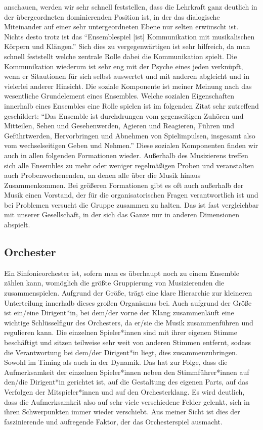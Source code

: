 anschauen, werden wir sehr schnell feststellen, dass die Lehrkraft ganz deutlich
in der übergeordneten dominierenden Position ist, in der das dialogische
Miteinander auf einer sehr untergeordneten Ebene nur selten erwünscht ist.
Nichts desto trotz ist das \enquote{Ensemblespiel [ist] Kommunikation mit
musikalischen Körpern und Klängen.} \autocite[62]{doerne:umfassend_musizieren}
Sich dies zu vergegenwärtigen ist sehr hilfreich, da man schnell feststellt
welche zentrale Rolle dabei die Kommunikation spielt. Die Kommunikation wiederum
ist sehr eng mit der Psyche eines jeden verknüpft, wenn er Sitautionen für sich
selbst auswertet und mit anderen abgleicht und in vielerlei anderer Hinsicht.
Die soziale Komponente ist meiner Meinung nach das wesentliche Grundelement
eines Ensembles. Welche sozialen Eigenschaften innerhalb eines Ensembles eine
Rolle spielen ist im folgenden Zitat sehr zutreffend geschildert: \enquote{Das
Ensemble ist durchdrungen vom gegenseitigen Zuhören und Mitteilen, Sehen und
Gesehenwerden, Agieren und Reagieren, Führen und Geführtwerden, Hervorbringen
und Abnehmen von Spielimpulsen, insgesamt also vom wechselseitigen Geben und
Nehmen.} \autocite[62]{doerne:umfassend_musizieren} Diese sozialen Komponenten
finden wir auch in allen folgenden Formationen wieder. Außerhalb des Musizierens
treffen sich alle Ensembles zu mehr oder weniger regelmäßigen Proben und
veranstalten auch Probenwochenenden, an denen alle über die Musik hinaus
Zusammenkommen. Bei größeren Formationen gibt es oft auch außerhalb der Musik
einen Vorstand, der für die organisatorischen Fragen verantwortlich ist und bei
Problemen versucht die Gruppe zusammen zu halten. Das ist fast vergleichbar mit
unserer Gesellschaft, in der sich das Ganze nur in anderen Dimensionen abspielt.



\subsection{Orchester} 

Ein Sinfonieorchester ist, sofern man es überhaupt noch zu einem Ensemble zählen
kann, womöglich die größte Gruppierung von Musizierenden die zusammenspielen.
Aufgrund der Größe, trägt eine klare Hierarchie zur kleineren Unterteilung
innerhalb dieses großen Organismus bei. Auch aufgrund der Größe ist ein/eine
Dirigent*in, bei dem/der vorne der Klang zusammenläuft eine wichtige
Schlüsselfigur des Orchesters, da er/sie die Musik zusammenführen und regulieren
kann. Die einzelnen Spieler*innen sind mit ihrer eigenen Stimme beschäftigt und
sitzen teilweise sehr weit von anderen Stimmen entfernt, sodass die
Verantwortung bei dem/der Dirigent*in liegt, dies zusammenzubringen. Sowohl im
Timing als auch in der Dynamik. Das hat zur Folge, dass die Aufmerksamkeit der
einzelnen Spieler*innen neben den Stimmführer*innen auf den/die Dirigent*in
gerichtet ist, auf die Gestaltung des eigenen Parts, auf das Verfolgen der
Mitspieler*innen und auf den Orchesterklang.
\autocite[56]{doerne:umfassend_musizieren} Es wird deutlich, dass die
Aufmerksamkeit also auf sehr viele verschiedene Felder gelenkt, sich in
ihren Schwerpunkten immer wieder verschiebt. Aus meiner Sicht
ist dies der faszinierende und aufregende Faktor, der das Orchesterspiel
ausmacht. 

